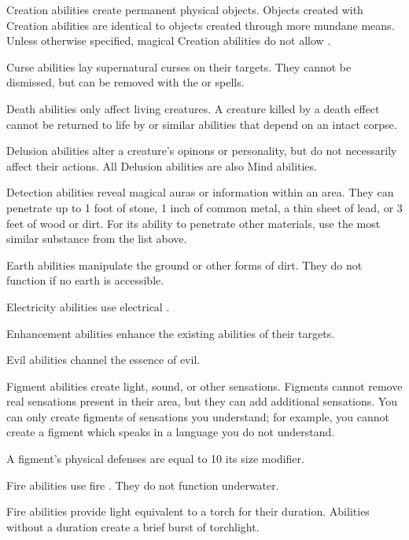      Creation abilities create permanent physical objects.
    Objects created with Creation abilities are identical to objects created through more mundane means.
    Unless otherwise specified, magical Creation abilities do not allow . 

     Curse abilities lay supernatural curses on their targets.
    They cannot be dismissed, but can be removed with the  or  spells.

     Death abilities only affect living creatures.
    A creature killed by a death effect cannot be returned to life by  or similar abilities that depend on an intact corpse.

     Delusion abilities alter a creature's opinons or personality, but do not necessarily affect their actions.
    All Delusion abilities are also Mind abilities.

     Detection abilities reveal magical auras or information within an area.
    They can penetrate up to 1 foot of stone, 1 inch of common metal, a thin sheet of lead, or 3 feet of wood or dirt.
    For its ability to penetrate other materials, use the most similar substance from the list above.

     Earth abilities manipulate the ground or other forms of dirt.
    They do not function if no earth is accessible.

     Electricity abilities use electrical .

     Enhancement abilities enhance the existing abilities of their targets.

     Evil abilities channel the essence of evil.

     Figment abilities create light, sound, or other sensations.
    Figments cannot remove real sensations present in their area, but they can add additional sensations.
    You can only create figments of sensations you understand; for example, you cannot create a figment which speaks in a language you do not understand.
    \par A figment's physical defenses are equal to 10 \add its size modifier.

     Fire abilities use fire . They do not function underwater.
    \par Fire abilities provide light equivalent to a torch for their duration.
    Abilities without a duration create a brief burst of torchlight.

